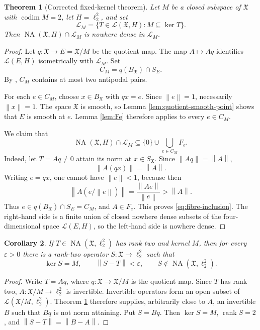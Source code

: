 \documentclass[11pt]{article}
\newtheorem{theorem}{Theorem}[section]
\newtheorem{corollary}[theorem]{Corollary}
\theoremstyle{definition}
\newcommand{\NA}{\operatorname{NA}}
\newcommand{\calL}{\mathcal L}
\newcommand{\rank}{\operatorname{rank}}
\newcommand{\codim}{\operatorname{codim}}
\newcommand{\X}{\mathfrak X}
\newcommand{\norm}[1]{\left\lVert #1\right\rVert}
\begin{document}
\begin{theorem}[Corrected fixed-kernel theorem]\label{thm:fixed-kernel}
Let \(M\) be a closed subspace of \(\X\) with \(\codim M=2\), let
\(H=\ell_2^2\), and set
\[
       \calL_M=\{T\in\calL(\X,H):M\subseteq\ker T\}.
\]
Then \(\NA(\X,H)\cap\calL_M\) is nowhere dense in \(\calL_M\).
\end{theorem}

\begin{proof}
Let \(q:\X\to E=\X/M\) be the quotient map.  The map
\(A\mapsto Aq\) identifies \(\calL(E,H)\) isometrically with \(\calL_M\).
Set
\[
                 C_M=q(B_\X)\cap S_E.
\]
By \cite[Proposition 6(b)]{Martin2025}, \(C_M\) contains at most two
antipodal pairs.

For each \(e\in C_M\), choose \(x\in B_\X\) with \(qx=e\).  Since
\(\norm{e}=1\), necessarily \(\norm{x}=1\).  The space \(\X\) is smooth, so
Lemma \ref{lem:quotient-smooth-point} shows that \(E\) is smooth at \(e\).
Lemma \ref{lem:Fe} therefore applies to every \(e\in C_M\).

We claim that
\begin{equation}\label{eq:fibre-inclusion}
 \NA(\X,H)\cap\calL_M
 \subseteq
 \{0\}\cup\bigcup_{e\in C_M}F_e.
\end{equation}
Indeed, let \(T=Aq\neq0\) attain its norm at \(x\in S_\X\).  Since
\(\norm{Aq}=\norm{A}\),
\[
                \norm{A(qx)}=\norm{A}.
\]
Writing \(e=qx\), one cannot have \(\norm{e}<1\), because then
\[
       \norm{A(e/\norm{e})}
       =\frac{\norm{Ae}}{\norm{e}}
       >\norm{A}.
\]
Thus \(e\in q(B_\X)\cap S_E=C_M\), and \(A\in F_e\).  This proves
\eqref{eq:fibre-inclusion}.  The right-hand side is a finite union of closed
nowhere dense subsets of the four-dimensional space \(\calL(E,H)\), so the
left-hand side is nowhere dense.
\end{proof}

\begin{corollary}\label{cor:fixed-kernel}
If \(T\in\NA(\X,\ell_2^2)\) has rank two and kernel \(M\), then for every
\(\varepsilon>0\) there is a rank-two operator
\(S:\X\to\ell_2^2\) such that
\[
       \ker S=M,\qquad \norm{S-T}<\varepsilon,
       \qquad S\notin\NA(\X,\ell_2^2).
\]
\end{corollary}

\begin{proof}
Write \(T=Aq\), where \(q:\X\to\X/M\) is the quotient map.  Since \(T\)
has rank two, \(A:\X/M\to\ell_2^2\) is invertible.  Invertible operators form
an open subset of \(\calL(\X/M,\ell_2^2)\).  Theorem
\ref{thm:fixed-kernel} therefore supplies, arbitrarily close to \(A\), an
invertible \(B\) such that \(Bq\) is not norm attaining.  Put \(S=Bq\).
Then \(\ker S=M\), \(\rank S=2\), and
\(\norm{S-T}=\norm{B-A}\).
\end{proof}
\end{document}
